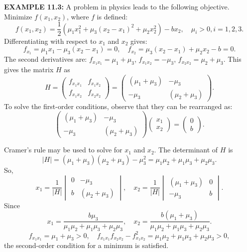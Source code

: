 \begin{original}
\textbf{EXAMPLE 11.3:} A problem in physics leads to the following objective. Minimize $f(x_1, x_2)$, where $f$ is defined:
\[
f(x_1, x_2) = \frac{1}{2}(\mu_1 x_1^2 + \mu_3(x_2 - x_1)^2 + \mu_2 x_2^2) - bx_2, \quad \mu_i > 0, i = 1,2,3.
\]
Differentiating with respect to $x_1$ and $x_2$ gives:
\[
f_{x_1} = \mu_1 x_1 - \mu_3(x_2 - x_1) = 0, \quad f_{x_2} = \mu_3(x_2 - x_1) + \mu_2 x_2 - b = 0.
\]
The second derivatives are: $f_{x_1x_1} = \mu_1 + \mu_3$, $f_{x_1x_2} = -\mu_3$, $f_{x_2x_2} = \mu_2 + \mu_3$. This gives the matrix $H$ as
\[
H = \begin{pmatrix} f_{x_1x_1} & f_{x_1x_2} \\ f_{x_1x_2} & f_{x_2x_2} \end{pmatrix} = \begin{pmatrix} (\mu_1 + \mu_3) & -\mu_3 \\ -\mu_3 & (\mu_2 + \mu_3) \end{pmatrix}.
\]
To solve the first-order conditions, observe that they can be rearranged as:
\[
\begin{pmatrix} (\mu_1 + \mu_3) & -\mu_3 \\ -\mu_3 & (\mu_2 + \mu_3) \end{pmatrix} \begin{pmatrix} x_1 \\ x_2 \end{pmatrix} = \begin{pmatrix} 0 \\ b \end{pmatrix}.
\]

Cramer's rule may be used to solve for $x_1$ and $x_2$. The determinant of $H$ is
\[
|H| = (\mu_1 + \mu_3)(\mu_2 + \mu_3) - \mu_3^2 = \mu_1\mu_2 + \mu_1\mu_3 + \mu_2\mu_3.
\]
So,
\[
x_1 = \frac{1}{|H|}\begin{vmatrix} 0 & -\mu_3 \\ b & (\mu_2 + \mu_3) \end{vmatrix}, \quad x_2 = \frac{1}{|H|}\begin{vmatrix} (\mu_1 + \mu_3) & 0 \\ -\mu_3 & b \end{vmatrix}.
\]
Since
\[
x_1 = \frac{b\mu_3}{\mu_1\mu_2 + \mu_1\mu_3 + \mu_2\mu_3}, \quad x_2 = \frac{b(\mu_1 + \mu_3)}{\mu_1\mu_2 + \mu_1\mu_3 + \mu_2\mu_3}.
\]
\[
f_{x_1x_1} = \mu_1 + \mu_3 > 0, \quad f_{x_1x_1}f_{x_2x_2} - f_{x_1x_2}^2 = \mu_1\mu_2 + \mu_1\mu_3 + \mu_2\mu_3 > 0,
\]
the second-order condition for a minimum is satisfied.
\end{original}
